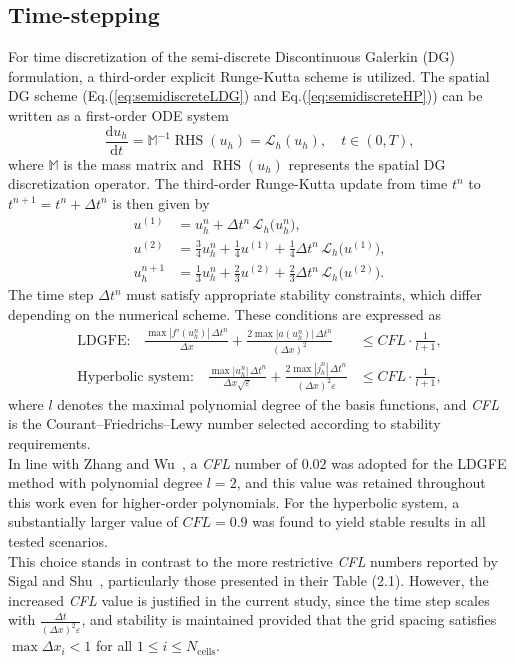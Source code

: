 \documentclass[a4paper,12pt]{paper}
\begin{document}
\subsection{Time-stepping}\label{sec:TimeStep}
For time discretization of the semi-discrete Discontinuous Galerkin (DG) formulation, a third-order explicit Runge-Kutta scheme is utilized. The spatial DG scheme (Eq.(\ref{eq:semidiscreteLDG}) and Eq.(\ref{eq:semidiscreteHP})) can be written as a first-order ODE system
\[
\frac{\mathrm{d} u_h}{\mathrm{d} t} = \mathbb{M}^{-1} \operatorname{RHS}(u_h) = \mathcal{L}_h(u_h), \quad t \in (0, T),
\]
where \(\mathbb{M}\) is the mass matrix and \(\operatorname{RHS}(u_h)\) represents the spatial DG discretization operator.
The third-order Runge-Kutta update from time \( t^n \) to \( t^{n+1} = t^n + \Delta t^n \) is then given by
\[
\begin{aligned}
	u^{(1)} &= u_h^n + \Delta t^n \, \mathcal{L}_h\big(u_h^n\big), \\
	u^{(2)} &= \frac{3}{4} u_h^n + \frac{1}{4} u^{(1)} + \frac{1}{4} \Delta t^n \, \mathcal{L}_h\big(u^{(1)}\big), \\
	u_h^{n+1} &= \frac{1}{3} u_h^n + \frac{2}{3} u^{(2)} + \frac{2}{3} \Delta t^n \, \mathcal{L}_h\big(u^{(2)}\big).
\end{aligned}
\]
The time step \( \Delta t^n \) must satisfy appropriate stability constraints, which differ depending on the numerical scheme. These conditions are expressed as\\
\begin{align}
	\text{LDGFE:} \quad
	\frac{\max |f'(u_h^n)| \, \Delta t^n}{\Delta x} + \frac{2 \max |a(u_h^n)| \, \Delta t^n}{(\Delta x)^2} &\leq \textit{CFL} \cdot \frac{1}{l+ 1}, \\
	\text{Hyperbolic system:} \quad
	\frac{\max |u_h^n| \, \Delta t^n}{\Delta x \sqrt{\varepsilon}} + \frac{2 \max |j_h^n| \, \Delta t^n}{(\Delta x)^2 \varepsilon} &\leq \textit{CFL} \cdot \frac{1}{l+ 1},
\end{align}
where \( l \) denotes the maximal polynomial degree of the basis functions, and \textit{CFL} is the Courant–Friedrichs–Lewy number selected according to stability requirements.\\
In line with Zhang and Wu~\cite{Zhang2009}, a \textit{CFL} number of \( 0.02 \) was adopted for the LDGFE method with polynomial degree \( l = 2 \), and this value was retained throughout this work even for higher-order polynomials. For the hyperbolic system, a substantially larger value of \( \textit{CFL} = 0.9 \) was found to yield stable results in all tested scenarios.\\
This choice stands in contrast to the more restrictive \textit{CFL} numbers reported by Sigal and Shu~\cite{RKShuSigal}, particularly those presented in their Table (2.1). However, the increased \textit{CFL} value is justified in the current study, since the time step scales with \( \frac{\Delta t}{(\Delta x)^2\varepsilon} \), and stability is maintained provided that the grid spacing satisfies \( \max \Delta x_i < 1 \) for all \( 1 \leq i \leq N_{\text{cells}} \).
\end{document}
